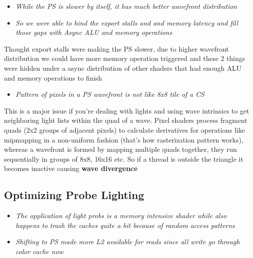 \documentclass[14pt]{article}
\begin{document}
	

\begin{itemize}
	\item \textit{While the PS is slower by itself, it has much better wavefront distribution}
	
	\item \textit{So we were able to hind the export stalls and and memory latency and fill those gaps with Async ALU and memory operations}
\end{itemize}

	Thought export stalls were making the PS slower, due to higher wavefront distribution we could have more memory operation triggered and these 2 things were hidden under a async distribution of other shaders that had enough ALU and memory operations to finish 

	
\begin{itemize}
	\item \textit{Pattern of pixels in a PS wavefront is not like 8x8 tile of a CS}
\end{itemize}
	
	This is a major issue if you're dealing with lights and using wave intrinsics to get neighboring light lists within the quad of a wave. Pixel shaders process fragment quads (2x2 groups of adjacent pixels) to calculate derivatives for operations like mipmapping in a non-uniform fashion (that's how rasterization pattern works), whereas a wavefront is formed by mapping multiple quads together, they run sequentially in groups of 8x8, 16x16 etc. So if a thread is outside the triangle it becomes inactive causing \textbf{wave divergence}
	
\subsection*{Optimizing Probe Lighting}


\begin{itemize}
	\item \textit{The application of light probs is a memory intensive shader while also happens to trash the caches quite a bit because of random access patterns}
	
	\item \textit{Shifting to PS made more L2 available for reads since all write go through color cache now}
\end{itemize}
\end{document}
